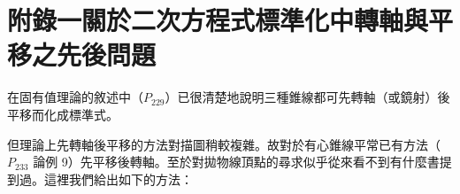 
\section*{附錄一\quad 關於二次方程式標準化中轉軸與平移之先後問題}
\label{sec:b4-a1}

在固有值理論的敘述中（$P_{229}$）已很清楚地說明三種錐線都可先轉軸（或鏡射）後平移而化成標準式。

但理論上先轉軸後平移的方法對描圖稍較複雜。故對於有心錐線平常已有方法（$P_{233}$ 論例 9）先平移後轉軸。至於對拋物線頂點的尋求似乎從來看不到有什麼書提到過。這裡我們給出如下的方法：

